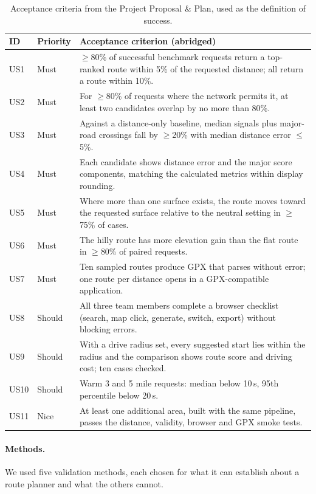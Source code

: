 \begin{table}[ht]
\centering\small
\caption{Acceptance criteria from the Project Proposal \& Plan, used as the definition of success.}
\label{tab:criteria}
\begin{tabularx}{\linewidth}{@{}l l Y@{}}
\toprule
ID & Priority & Acceptance criterion (abridged) \\
\midrule
US1 & Must & $\geq$80\% of successful benchmark requests return a top-ranked route within 5\% of the requested distance; all return a route within 10\%. \\
US2 & Must & For $\geq$80\% of requests where the network permits it, at least two candidates overlap by no more than 80\%. \\
US3 & Must & Against a distance-only baseline, median signals plus major-road crossings fall by $\geq$20\% with median distance error $\leq$5\%. \\
US4 & Must & Each candidate shows distance error and the major score components, matching the calculated metrics within display rounding. \\
US5 & Must & Where more than one surface exists, the route moves toward the requested surface relative to the neutral setting in $\geq$75\% of cases. \\
US6 & Must & The hilly route has more elevation gain than the flat route in $\geq$80\% of paired requests. \\
US7 & Must & Ten sampled routes produce GPX that parses without error; one route per distance opens in a GPX-compatible application. \\
US8 & Should & All three team members complete a browser checklist (search, map click, generate, switch, export) without blocking errors. \\
US9 & Should & With a drive radius set, every suggested start lies within the radius and the comparison shows route score and driving cost; ten cases checked. \\
US10 & Should & Warm 3 and 5 mile requests: median below 10\,s, 95th percentile below 20\,s. \\
US11 & Nice & At least one additional area, built with the same pipeline, passes the distance, validity, browser and GPX smoke tests. \\
\bottomrule
\end{tabularx}
\end{table}

\paragraph{Methods.}
We used five validation methods, each chosen for what it can establish about
a route planner and what the others cannot.

